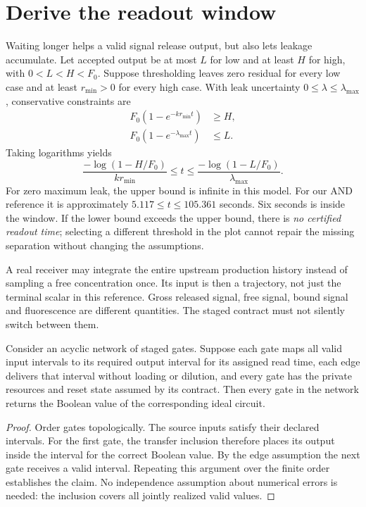 \section{Derive the readout window}

Waiting longer helps a valid signal release output, but also lets leakage
accumulate. Let accepted output be at most $L$ for low and at least $H$ for
high, with $0<L<H<F_0$. Suppose thresholding leaves zero residual for every low
case and at least $r_{\min}>0$ for every high case. With leak uncertainty
$0\leq\lambda\leq\lambda_{\max}$, conservative constraints are
\begin{align}
 F_0(1-e^{-kr_{\min}t})&\geq H,\\
 F_0(1-e^{-\lambda_{\max}t})&\leq L.
\end{align}
Taking logarithms yields
\begin{equation}
 \frac{-\log(1-H/F_0)}{kr_{\min}}\leq t\leq
 \frac{-\log(1-L/F_0)}{\lambda_{\max}} .
 \label{eq:window}
\end{equation}
For zero maximum leak, the upper bound is infinite in this model. For our AND
reference it is approximately $5.117\leq t\leq105.361$ seconds. Six seconds is
inside the window. If the lower bound exceeds the upper bound, there is
\emph{no certified readout time}; selecting a different threshold in the plot
cannot repair the missing separation without changing the assumptions.


A real receiver may integrate the entire upstream production history instead
of sampling a free concentration once. Its input is then a trajectory, not just
the terminal scalar in this reference. Gross released signal, free signal,
bound signal and fluorescence are different quantities. The staged contract
must not silently switch between them.

\begin{proposition}
Consider an acyclic network of staged gates. Suppose each gate maps all valid
input intervals to its required output interval for its assigned read time,
each edge delivers that interval without loading or dilution, and every gate
has the private resources and reset state assumed by its contract. Then every
gate in the network returns the Boolean value of the corresponding ideal
circuit.
\end{proposition}
\begin{proof}
Order gates topologically. The source inputs satisfy their declared intervals.
For the first gate, the transfer inclusion therefore places its output inside
the interval for the correct Boolean value. By the edge assumption the next
gate receives a valid interval. Repeating this argument over the finite order
establishes the claim. No independence assumption about numerical errors is
needed: the inclusion covers all jointly realized valid values.
\end{proof}

